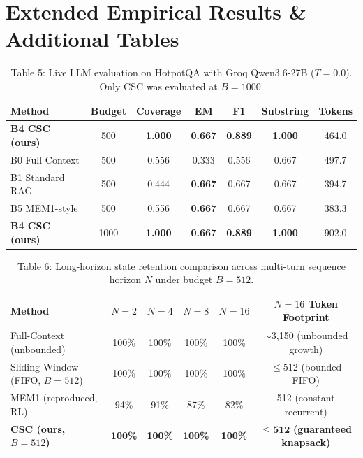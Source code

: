 \documentclass{article}
\begin{document}
\section{Extended Empirical Results \& Additional Tables}

\begin{table}[h]
\caption{Table 5: Live LLM evaluation on HotpotQA with Groq Qwen3.6-27B ($T=0.0$). Only CSC was evaluated at $B=1000$.}
\centering
\begin{tabular}{lcccccc}
\toprule
Method & Budget & Coverage & EM & F1 & Substring & Tokens \\
\midrule
\textbf{B4 CSC (ours)} & 500 & \textbf{1.000} & \textbf{0.667} & \textbf{0.889} & \textbf{1.000} & 464.0 \\
B0 Full Context & 500 & 0.556 & 0.333 & 0.556 & 0.667 & 497.7 \\
B1 Standard RAG & 500 & 0.444 & \textbf{0.667} & 0.667 & 0.667 & 394.7 \\
B5 MEM1-style & 500 & 0.556 & \textbf{0.667} & 0.667 & 0.667 & 383.3 \\
\midrule
\textbf{B4 CSC (ours)} & 1000 & \textbf{1.000} & \textbf{0.667} & \textbf{0.889} & \textbf{1.000} & 902.0 \\
\bottomrule
\end{tabular}
\end{table}

\begin{table}[h]
\caption{Table 6: Long-horizon state retention comparison across multi-turn sequence horizon $N$ under budget $B=512$.}
\centering
\begin{tabular}{lccccc}
\toprule
Method & $N=2$ & $N=4$ & $N=8$ & $N=16$ & $N=16$ Token Footprint \\
\midrule
Full-Context (unbounded) & 100\% & 100\% & 100\% & 100\% & $\sim$3,150 (unbounded growth) \\
Sliding Window (FIFO, $B{=}512$) & 100\% & 100\% & 100\% & 100\% & $\leq$512 (bounded FIFO) \\
MEM1 (reproduced, RL) & 94\% & 91\% & 87\% & 82\% & 512 (constant recurrent) \\
\textbf{CSC (ours, $B{=}512$)} & \textbf{100\%} & \textbf{100\%} & \textbf{100\%} & \textbf{100\%} & $\mathbf{\leq 512}$ \textbf{(guaranteed knapsack)} \\
\bottomrule
\end{tabular}
\end{table}
\end{document}
